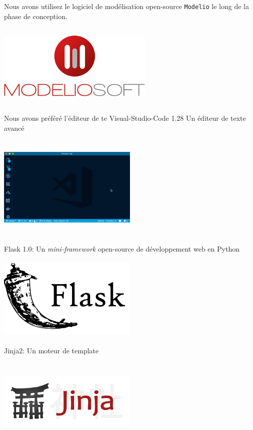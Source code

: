 \documentclass[12pt]{report}
\begin{document}
	 Nous avons utilisez le logiciel de modélisation open-source {\tt Modelio} le long de la phase de conception.
		
		\begin{center}
			\includegraphics[scale=1, width=0.56\textwidth, height=4cm]{modelio}
			\label{modelio}
		\end{center}
	
	Nous avons préféré l'éditeur de te
	 Visual-Studio-Code 1.28 Un éditeur de texte avancé
		\begin{center}
			\includegraphics[scale=1, width=0.5\textwidth, height=5cm]{vscode}
			\label{vscode}
		\end{center}
		Flask 1.0:  Un \textit{mini-framework} open-source de développement web en Python
		
		\begin{center}
			\includegraphics[scale=1, width=0.5\textwidth, height=4cm]{flask}
			\label{flask}
		\end{center}
		 Jinja2: Un moteur de template
		\begin{center}
			\includegraphics[scale=1, width=0.5\textwidth, height=4cm]{jinja}
			\label{jinja}
		\end{center}
		
\end{document}
